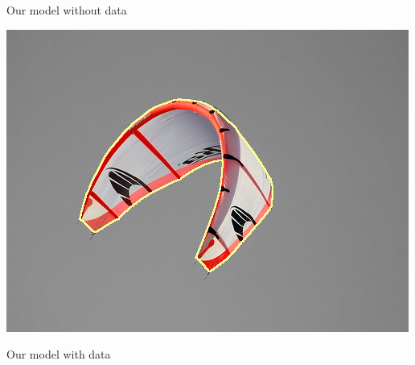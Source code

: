 \begin{frame}
\begin{minipage}[t][0.55\textheight][t]{0.5\textwidth}
Our model without data
\end{minipage}%
\begin{minipage}[t][0.55\textheight][t]{0.5\textwidth}
\center
\includegraphics[scale=0.22]{figures/applications-imaging/contour-correction/kite/corrected-seg-with-data.png}

Our model with data
\end{minipage}%

\end{frame}

